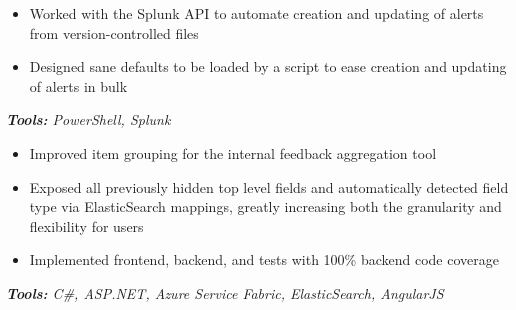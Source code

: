 \documentclass[10pt,letter]{altacv}
\begin{document}

\begin{fullwidth}
\marginpar{\makesidebarheader}
    \vspace*{-1\baselineskip}
\makecvheader
\end{fullwidth}


\begin{itemize}
  \item Worked with the Splunk API to automate creation and updating of alerts from version-controlled files
  \item Designed sane defaults to be loaded by a script to ease creation and updating of alerts in bulk
\end{itemize}
\textit{\textbf{Tools:} PowerShell, Splunk}

\divider

\begin{itemize}
\item Improved item grouping for the internal feedback aggregation tool
\item Exposed all previously hidden top level fields and automatically detected field type via ElasticSearch mappings, greatly increasing both the granularity and flexibility for users
\item Implemented frontend, backend, and tests with 100\% backend code coverage
\end{itemize}
\textit{\textbf{Tools:} C\#, ASP.NET, Azure Service Fabric, ElasticSearch, AngularJS}
\end{document}

